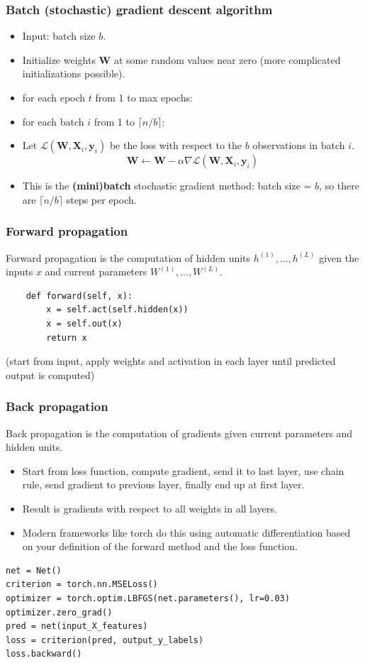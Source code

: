 \documentclass{beamer}
\begin{document}
\begin{frame}
  \frametitle{Batch (stochastic) gradient descent algorithm}
  \begin{itemize}
  \item Input: batch size $b$.
  \item Initialize weights $\mathbf W$ at some random values near
    zero (more complicated initializations possible).
  \item for each epoch $t$ from 1 to max epochs:
  \item for each batch $i$ from 1 to $\lceil n/b \rceil$:
  \item Let $\mathcal L( \mathbf W, \mathbf X_i, \mathbf y_i )$ be the loss with
    respect to the $b$ observations in batch $i$.
  $$
\mathbf W \gets \mathbf W - \alpha \nabla \mathcal L(\mathbf W, \mathbf X_i, \mathbf y_i)
$$
\item This is the \textbf{(mini)batch} stochastic gradient method:
  batch size = $b$, so there are $\lceil n/b \rceil$ steps per epoch.
  \end{itemize}
\end{frame}

\begin{frame}[fragile]
  \frametitle{Forward propagation}
Forward propagation is the computation of hidden units
$h^{(1)},\dots,h^{(L)}$ given the inputs $x$ and current parameters
$W^{(1)},\dots,W^{(L)}$.
\begin{verbatim}
    def forward(self, x):
        x = self.act(self.hidden(x))
        x = self.out(x)
        return x
\end{verbatim}
(start from input, apply weights and activation in each layer until
predicted output is computed)
\end{frame}

\begin{frame}[fragile]
  \frametitle{Back propagation}
Back propagation is the computation of gradients given current
parameters and hidden units.
\begin{itemize}
\item Start from loss function, compute gradient, send it to last
  layer, use chain rule, send gradient to previous layer, finally end
  up at first layer.
\item Result is gradients with respect to all weights in all layers.
\item Modern frameworks like torch do this using automatic
  differentiation based on your definition of the forward method and
  the loss function.
\end{itemize}

\begin{verbatim}
net = Net()
criterion = torch.nn.MSELoss()
optimizer = torch.optim.LBFGS(net.parameters(), lr=0.03)
optimizer.zero_grad()
pred = net(input_X_features)
loss = criterion(pred, output_y_labels)
loss.backward()
\end{verbatim}

\end{frame}
\end{document}
